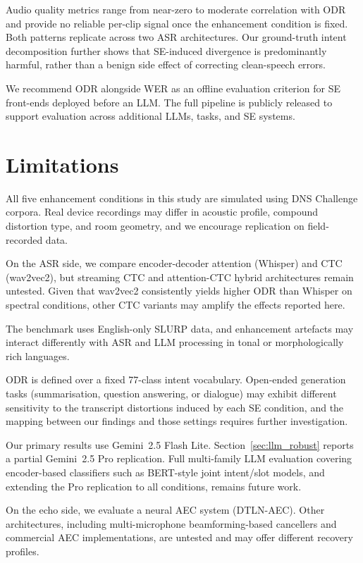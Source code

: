 \documentclass[11pt]{article}
\begin{document}
Audio quality metrics range from near-zero to moderate correlation
with ODR and provide no reliable per-clip signal once the enhancement
condition is fixed. Both patterns replicate across two ASR architectures. Our
ground-truth intent decomposition further shows that SE-induced
divergence is predominantly harmful, rather than a benign side effect
of correcting clean-speech errors.

We recommend ODR alongside WER as an offline evaluation criterion
for SE front-ends deployed before an LLM.
The full pipeline is publicly released to support evaluation across
additional LLMs, tasks, and SE systems.
 
\section*{Limitations}

All five enhancement conditions in this study are simulated using DNS
Challenge corpora. Real device recordings may differ in acoustic
profile, compound distortion type, and room geometry, and we encourage
replication on field-recorded data.

On the ASR side, we compare encoder-decoder attention (Whisper) and
CTC (wav2vec2), but streaming CTC and attention-CTC hybrid architectures
remain untested. Given that wav2vec2 consistently yields higher ODR
than Whisper on spectral conditions, other CTC variants may amplify
the effects reported here.

The benchmark uses English-only SLURP data, and enhancement artefacts
may interact differently with ASR and LLM processing in tonal or
morphologically rich languages.

ODR is defined over a fixed 77-class intent vocabulary. Open-ended generation tasks (summarisation, question answering, or dialogue)
may exhibit different sensitivity to the transcript distortions induced
by each SE condition, and the mapping between our findings and those
settings requires further investigation.

Our primary results use Gemini~2.5 Flash Lite. Section~\ref{sec:llm_robust}
reports a partial Gemini~2.5 Pro replication.
Full multi-family LLM evaluation covering encoder-based classifiers
such as BERT-style joint intent/slot models, and extending the Pro
replication to all conditions, remains future work.

On the echo side, we evaluate a neural AEC system (DTLN-AEC).
Other architectures, including multi-microphone beamforming-based
cancellers and commercial AEC implementations, are untested and may
offer different recovery profiles.
\end{document}
